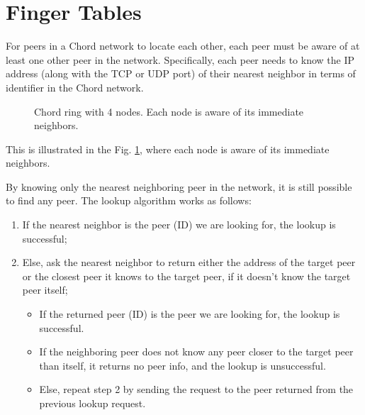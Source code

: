 \section{Finger Tables}\label{sec:finger-tables}
For peers in a Chord network to locate each other, each peer must be aware of at least one other peer in the network.
Specifically, each peer needs to know the IP address (along with the TCP or UDP port) of their nearest neighbor in terms of identifier in the Chord network.
\begin{figure}[htbp]
    \centering
{}
\caption{Chord ring with 4 nodes. Each node is aware of its immediate neighbors.}
\label{fig:chord-ring-peer-neighbours}
\end{figure}

This is illustrated in the Fig. \ref{fig:chord-ring-peer-neighbours}, where each node is aware of its immediate neighbors.

By knowing only the nearest neighboring peer in the network, it is still possible to find any peer.
The lookup algorithm works as follows:
\begin{enumerate}
    \item If the nearest neighbor is the peer (ID) we are looking for, the lookup is successful;
	\item Else, ask the nearest neighbor to return either the address of the target peer or the closest peer it knows to the target peer, if it doesn't know the target peer itself;
	\begin{itemize}
        \item If the returned peer (ID) is the peer we are looking for, the lookup is successful.
        \item If the neighboring peer does not know any peer closer to the target peer than itself, it returns no peer info, and the lookup is unsuccessful.
        \item Else, repeat step 2 by sending the request to the peer returned from the previous lookup request.
    \end{itemize}
\end{enumerate}


